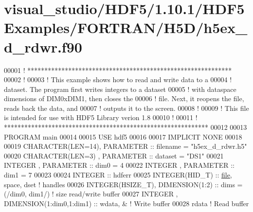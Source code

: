 \hypertarget{visual__studio_2_h_d_f5_21_810_81_2_h_d_f5_examples_2_f_o_r_t_r_a_n_2_h5_d_2h5ex__d__rdwr_8f90_source}{}\section{visual\+\_\+studio/\+H\+D\+F5/1.10.1/\+H\+D\+F5\+Examples/\+F\+O\+R\+T\+R\+A\+N/\+H5\+D/h5ex\+\_\+d\+\_\+rdwr.f90}
\label{visual__studio_2_h_d_f5_21_810_81_2_h_d_f5_examples_2_f_o_r_t_r_a_n_2_h5_d_2h5ex__d__rdwr_8f90_source}

\begin{DoxyCode}
00001 \textcolor{comment}{! ************************************************************}
00002 \textcolor{comment}{!}
00003 \textcolor{comment}{!  This example shows how to read and write data to a}
00004 \textcolor{comment}{!  dataset.  The program first writes integers to a dataset}
00005 \textcolor{comment}{!  with dataspace dimensions of DIM0xDIM1, then closes the}
00006 \textcolor{comment}{!  file.  Next, it reopens the file, reads back the data, and}
00007 \textcolor{comment}{!  outputs it to the screen.}
00008 \textcolor{comment}{!}
00009 \textcolor{comment}{!  This file is intended for use with HDF5 Library verion 1.8}
00010 \textcolor{comment}{!}
00011 \textcolor{comment}{! ************************************************************}
00012 
00013 \textcolor{keyword}{PROGRAM} main
00014 
00015   \textcolor{keywordtype}{USE }hdf5
00016 
00017   \textcolor{keywordtype}{IMPLICIT NONE}
00018 
00019   \textcolor{keywordtype}{CHARACTER(LEN=14)}, \textcolor{keywordtype}{PARAMETER} :: filename = \textcolor{stringliteral}{"h5ex\_d\_rdwr.h5"}
00020   \textcolor{keywordtype}{CHARACTER(LEN=3)} , \textcolor{keywordtype}{PARAMETER} :: dataset = \textcolor{stringliteral}{"DS1"}
00021   \textcolor{keywordtype}{INTEGER}          , \textcolor{keywordtype}{PARAMETER} :: dim0     = 4
00022   \textcolor{keywordtype}{INTEGER}          , \textcolor{keywordtype}{PARAMETER} :: dim1     = 7
00023 
00024   \textcolor{keywordtype}{INTEGER} :: hdferr
00025   \textcolor{keywordtype}{INTEGER(HID\_T)} :: \hyperlink{structfile}{file}, space, dset \textcolor{comment}{! handles}
00026   \textcolor{keywordtype}{INTEGER(HSIZE\_T)}, \textcolor{keywordtype}{DIMENSION(1:2)}           :: dims = (/dim0, dim1/) \textcolor{comment}{! size read/write buffer}
00027   \textcolor{keywordtype}{INTEGER}         , \textcolor{keywordtype}{DIMENSION(1:dim0,1:dim1)} :: wdata, &  \textcolor{comment}{! Write buffer }
00028                                                 rdata     \textcolor{comment}{! Read buffer}

\end{DoxyCode}
